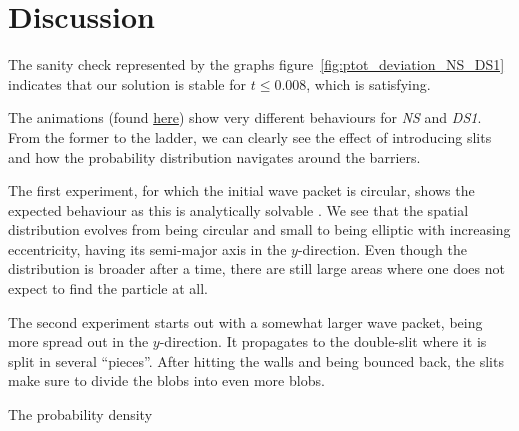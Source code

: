 \section{Discussion}\label{sec:discussion}



The sanity check represented by the graphs figure~\ref{fig:ptot_deviation_NS_DS1} indicates that our solution is stable for $t\leq 0.008$, which is satisfying. 


The animations (found \href{\animlink}{here}) show very different behaviours for \textit{NS} and \textit{DS1}. From the former to the ladder, we can clearly see the effect of introducing slits and how the probability distribution navigates around the barriers. 

The first experiment, for which the initial wave packet is circular, shows the expected behaviour as this is analytically solvable . We see that the spatial distribution evolves from being circular and small to being elliptic with increasing eccentricity, having its semi-major axis in the $y$-direction. Even though the distribution is broader after a time, there are still large areas where one does not expect to find the particle at all.

The second experiment starts out with a somewhat larger wave packet, being more spread out in the $y$-direction. It propagates to the double-slit where it is split in several ``pieces''. After hitting the walls and being bounced back, the slits make sure to divide the blobs into even more blobs. 





The probability density 




